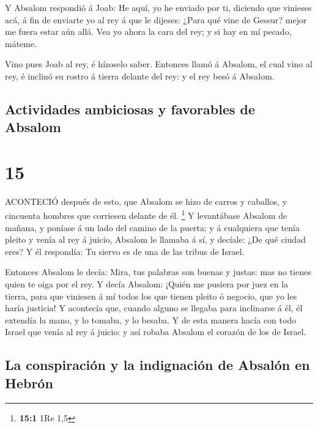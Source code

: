  Y Absalom respondió á Joab: He aquí, yo he enviado por ti,
diciendo que vinieses acá, á fin de enviarte yo al rey á que le dijeses:
¿Para qué vine de Gessur? mejor me fuera estar aún allá. Vea yo ahora la
cara del rey; y si hay en mí pecado, máteme.

 Vino pues Joab al rey, é hízoselo saber. Entonces llamó á
Absalom, el cual vino al rey, é inclinó su rostro á tierra delante del
rey: y el rey besó á Absalom.

\hypertarget{actividades-ambiciosas-y-favorables-de-absalom}{%
\subsection{Actividades ambiciosas y favorables de
Absalom}\label{actividades-ambiciosas-y-favorables-de-absalom}}

\hypertarget{section-14}{%
\section{15}\label{section-14}}

 ACONTECIÓ después de esto, que Absalom se hizo de carros y
caballos, y cincuenta hombres que corriesen delante de él. \footnote{\textbf{15:1}
  1Re 1,5}  Y levantábase Absalom de mañana, y poníase á un
lado del camino de la puerta; y á cualquiera que tenía pleito y venía al
rey á juicio, Absalom le llamaba á sí, y decíale: ¿De qué ciudad eres? Y
él respondía: Tu siervo es de una de las tribus de Israel.

 Entonces Absalom le decía: Mira, tus palabras son buenas y
justas: mas no tienes quien te oiga por el rey.  Y decía
Absalom: ¡Quién me pusiera por juez en la tierra, para que viniesen á mí
todos los que tienen pleito ó negocio, que yo les haría justicia!
 Y acontecía que, cuando alguno se llegaba para inclinarse á
él, él extendía la mano, y lo tomaba, y lo besaba.  Y de
esta manera hacía con todo Israel que venía al rey á juicio: y así
robaba Absalom el corazón de los de Israel.

\hypertarget{la-conspiraciuxf3n-y-la-indignaciuxf3n-de-absaluxf3n-en-hebruxf3n}{%
\subsection{La conspiración y la indignación de Absalón en
Hebrón}\label{la-conspiraciuxf3n-y-la-indignaciuxf3n-de-absaluxf3n-en-hebruxf3n}}

